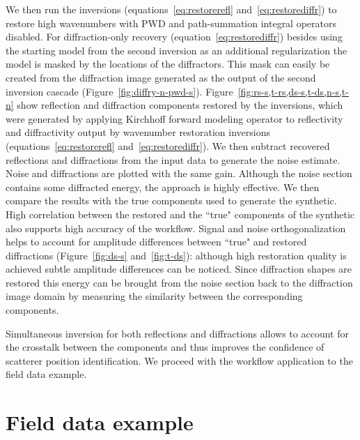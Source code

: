 We then run the inversions (equations~\ref{eq:restorerefl} and~\ref{eq:restorediffr}) to restore high wavenumbers with PWD and path-summation integral operators disabled. For diffraction-only
recovery (equation~\ref{eq:restorediffr}) besides using the starting model from the second inversion as an additional regularization the model 
is masked by the locations of the diffractors. This mask can easily be created from the diffraction image generated as the output of the
second inversion cascade (Figure~\ref{fig:diffry-n-pwd-s}). Figure~\ref{fig:rs-s,t-rs,ds-s,t-ds,n-s,t-n} show reflection and diffraction 
components restored by the inversions, which were generated by applying Kirchhoff forward modeling operator to reflectivity and
diffractivity output by wavenumber restoration inversions (equations~\ref{eq:restorerefl} and~\ref{eq:restorediffr}). We then subtract
recovered reflections and diffractions from the input data to generate the noise estimate. Noise and diffractions are plotted with the same
gain. 
Although the noise section contains some diffracted energy, the approach is highly effective. We then compare the results with the true components used to generate the synthetic.
High correlation between the restored and the ``true" components of the synthetic also supports high accuracy of the workflow.
Signal and noise orthogonalization helps to account for amplitude differences between ``true" and restored diffractions (Figure~\ref{fig:ds-s} and~\ref{fig:t-ds}):
although high restoration quality is achieved subtle amplitude differences can be noticed. Since diffraction shapes are restored 
this energy can be brought from the noise section back to the diffraction image domain by measuring the similarity between the corresponding components.

Simultaneous inversion for both reflections and diffractions allows to account for the crosstalk between the components and thus
improves the confidence of scatterer position identification. We proceed with the workflow application to the field data example. 


\section{Field data example}


